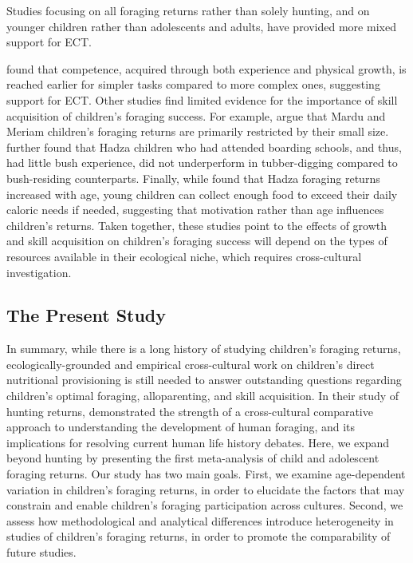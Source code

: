 Studies focusing on all foraging returns rather than solely hunting, and on younger children rather than adolescents and adults, have provided more mixed support for ECT.

\cite{bock_learning_2002} found that competence, acquired through both experience and physical growth, is reached earlier for simpler tasks compared to more complex ones, suggesting support for ECT. Other studies find limited evidence for the importance of skill acquisition of children’s foraging success. 
For example, \cite{ bird_constraints_2002, bird_children_2002, bird_mardu_2005} argue that Mardu and Meriam children’s foraging returns are primarily restricted by their small size.
\cite{blurton_jones_selection_2002} further found that Hadza children who had attended boarding schools, and thus, had little bush experience, did not underperform in tubber-digging compared to bush-residing counterparts. Finally, while \cite{crittenden_juvenile_2013} found that Hadza foraging returns increased with age, young children can collect enough food to exceed their daily caloric needs if needed, suggesting that motivation rather than age influences children’s returns. Taken together, these studies point to the effects of growth and skill acquisition on children’s foraging success will depend on the types of resources available in their ecological niche, which requires cross-cultural investigation. 

\subsection{The Present Study}
In summary, while there is a long history of studying children’s foraging returns, ecologically-grounded and empirical cross-cultural work on children’s direct nutritional provisioning is still needed to answer outstanding questions regarding children’s optimal foraging, alloparenting, and skill acquisition. In their study of hunting returns, \cite{koster_life_2020} demonstrated the strength of a cross-cultural comparative approach to understanding the development of human foraging, and its implications for resolving current human life history debates. Here, we expand beyond hunting by presenting the first meta-analysis of child and adolescent foraging returns. Our study has two main goals. First, we examine age-dependent variation in children’s foraging returns, in order to elucidate the factors that may constrain and enable children’s foraging participation across cultures. Second, we assess how methodological and analytical differences introduce heterogeneity in studies of children’s foraging returns, in order to promote the comparability of future studies.  






